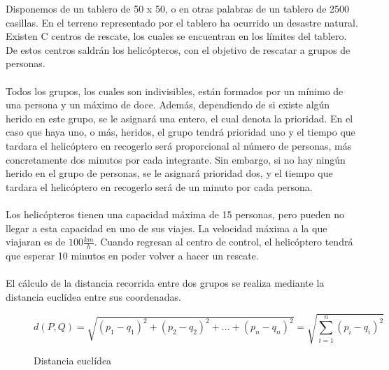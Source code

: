 Disponemos de un tablero de 50 x 50, o en otras palabras de un tablero de 2500 casillas. En el terreno representado por el tablero ha ocurrido un desastre natural. Existen C centros de rescate, los cuales se encuentran en los límites del tablero. De estos centros saldrán los helicópteros, con el objetivo de rescatar a grupos de personas.
\\ \\
Todos los grupos, los cuales son indivisibles, están formados por un mínimo de una persona y un máximo de doce. Además, dependiendo de si existe algún herido en este grupo, se le asignará una entero, el cual denota la prioridad. En el caso que haya uno, o más, heridos, el grupo tendrá prioridad uno y el tiempo que tardara el helicóptero en recogerlo será proporcional al número de personas, más concretamente dos minutos por cada integrante. Sin embargo, si no hay ningún herido en el grupo de personas, se le asignará prioridad dos, y el tiempo que tardara el helicóptero en recogerlo será de un minuto por cada persona.
\\ \\
Los helicópteros tienen una capacidad máxima de 15 personas, pero pueden no llegar a esta capacidad en uno de sus viajes. La velocidad máxima a la que viajaran es de $100 \frac{km}{h}$. Cuando regresan al centro de control, el helicóptero tendrá que esperar 10 minutos en poder volver a hacer un rescate.
\\ \\ 
El cálculo de la distancia recorrida entre dos grupos se realiza mediante la distancia euclídea entre sus coordenadas.\begin{figure}[h]
    \label{Distancia euclídea:1}
    \[ d(P, Q)=\sqrt{(p_1-q_1)^2+(p_2-q_2)^2+...+(p_n-q_n)^2}=\sqrt{\sum_{i=1}^{n}(p_i-q_i)^2} \]
    \caption{Distancia euclídea}
\end{figure}